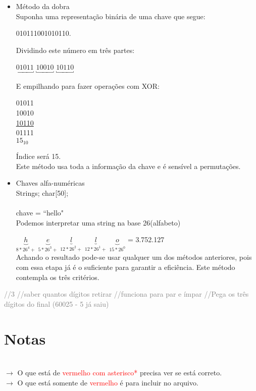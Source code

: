 \documentclass[a4paper, 12pt]{article}
\begin{document}
\begin{itemize}
\item {} Método da dobra\\
Suponha uma representação binária de uma chave que segue: 
\begin{center}
010111001010110.
\end{center}
Dividindo este número em três partes:
\begin{center}
$\underbracket{01011}_{}$ $\underbracket{10010}_{}$ $\underbracket{10110}_{}$
\end{center}
E empilhando para fazer operações com XOR:
\begin{center}
01011\\
10010\\
\underline{10110}\\
01111\\
 $15_{10}$
\end{center}
Índice será 15.\\
Este método usa toda a informação da chave e é sensível a permutações.

\item {} Chaves alfa-numéricas\\
Strings; char[50];\\
\\
chave = ``hello"\\
Podemos interpretar uma string na base 26(alfabeto)

$\underbrace{h}_{8*26^4+}$ $\underbrace{e}_{5*26^3+}$ $\underbrace{l}_{12*26^2+}$ $\underbrace{l}_{12*26^1+}$ $\underbrace{o}_{15*26^0}$ = 3.752.127\\

Achando o resultado pode-se usar qualquer um dos métodos anteriores, pois com essa etapa já é o suficiente para garantir a eficiência.
Este método contempla os três critérios.
\end{itemize}

\begin{algorithmic}[1]
	\State {}
\EndIf
{}
\EndWhile
{} \textcolor{gray}{//3}
 \textcolor{gray}{//saber quantos dígitos retirar}
 \textcolor{gray}{//funciona para par e ímpar}
\EndFor
\State {} \textcolor{gray}{//Pega os três dígitos do final (60025 - 5 já saiu)}

\end{algorithmic}

\section{Notas}
\textcolor{white}{.}\\
$\rightarrow$ O que está de \textcolor{red}{vermelho com asterisco*} precisa ver se está correto.\\
$\rightarrow$ O que está somente de \textcolor{red}{vermelho} é para incluir no arquivo.
\end{document}
